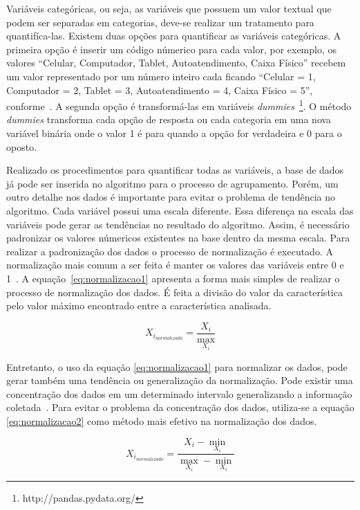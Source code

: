 Variáveis categóricas, ou seja, as variáveis que possuem um valor textual que podem ser separadas em categorias, deve-se realizar um tratamento para quantifíca-las. Existem duas opções para quantificar as variáveis categóricas. A primeira opção é inserir um código númerico para cada valor, por exemplo, os valores ``Celular, Computador, Tablet, Autoatendimento, Caixa Físico'' recebem um valor representado por um número inteiro cada ficando ``Celular = 1, Computador = 2, Tablet = 3, Autoatendimento = 4, Caixa Físico = 5'', conforme~. A segunda opção é transformá-las em variáveis \emph{dummies}~\footnote{http://pandas.pydata.org/}. O método \emph{dummies} transforma cada opção de resposta ou cada categoria em uma nova variável binária onde o valor 1 é para quando a opção for verdadeira e 0 para o oposto.

Realizado os procedimentos para quantificar todas as variáveis, a base de dados já pode ser inserida no algoritmo para o processo de agrupamento. Porém, um outro detalhe nos dados é importante para evitar o problema de tendência no algoritmo. Cada variável possui uma escala diferente. Essa diferença na escala das variáveis pode gerar as tendências no resultado do algoritmo. Assim, é necessário padronizar os valores númericos existentes na base dentro da mesma escala. Para realizar a padronização dos dados o processo de normalização é executado. A normalização mais comum a ser feita é manter os valores das variáveis entre 0 e 1~\cite{lattin:2011}. A equação~\ref{eq:normalizacao1} apresenta a forma mais simples de realizar o processo de normalização dos dados. É feita a divisão do valor da característica pelo valor máximo encontrado entre a característica analisada.

\begin{equation}
	X_{i_{normalizado}} = \frac{X_i}{\max_{X_i}}
	\label{eq:normalizacao1}
\end{equation}

Entretanto, o uso da equação \ref{eq:normalizacao1} para normalizar os dados, pode gerar também uma tendência ou generalização da normalização. Pode existir uma concentração dos dados em um determinado intervalo generalizando a informação coletada~\cite{masiero:2013}. Para evitar o problema da concentração dos dados, utiliza-se a equação \ref{eq:normalizacao2} como método mais efetivo na normalização dos dados.

\begin{equation}
	X_{i_{normalizado}} = \frac{X_i - \min_{X_i}}{\max_{X_i} - \min_{X_i}}
	\label{eq:normalizacao2}
\end{equation}

